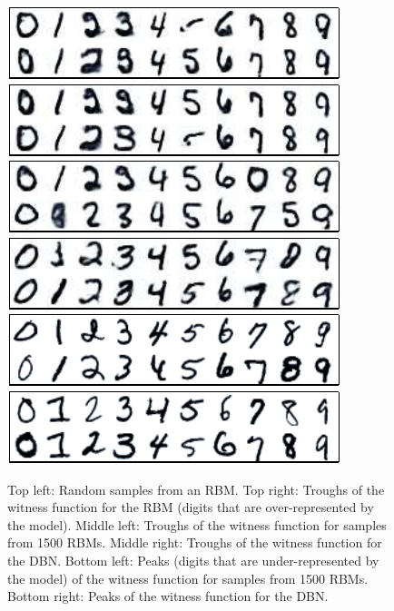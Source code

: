 \documentclass{article} %
\begin{document}
\begin{figure}[ht]
\centering
\includegraphics[width=0.48\columnwidth]{figures/rbm_samples}
\includegraphics[width=0.48\columnwidth]{figures/rbm_witness_troughs}
\\
\includegraphics[width=0.48\columnwidth]{figures/many_rbm_cond_witness_troughs}
\includegraphics[width=0.48\columnwidth]{figures/dbn_ft_cond_witness_troughs}
\\
\includegraphics[width=0.48\columnwidth]{figures/many_rbm_cond_witness_peaks}
\includegraphics[width=0.48\columnwidth]{figures/dbn_ft_cond_witness_peaks}
\caption{
Top left: Random samples from an RBM.
Top right: Troughs of the witness function for the RBM (digits that are over-represented by the model).
Middle left: Troughs of the witness function for samples from 1500 RBMs.
Middle right: Troughs of the witness function for the DBN.
Bottom left: Peaks (digits that are under-represented by the model) of the witness function for samples from 1500 RBMs.
Bottom right: Peaks of the witness function for the DBN.
}
\label{fig:digits}
\end{figure}
\end{document}
